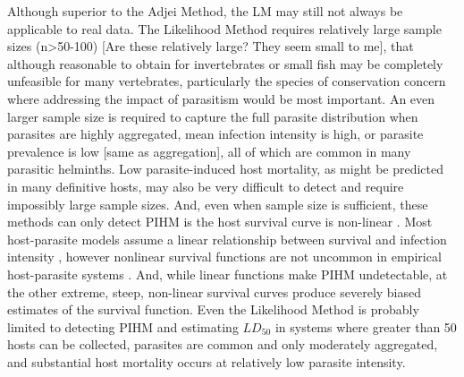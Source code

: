 \documentclass[12pt, a4paper]{article}
\begin{document}
Although superior to the Adjei Method, the LM may still not always be
applicable to real data.  The Likelihood Method requires relatively large
sample sizes (n>50-100) [Are these relatively large? They seem small to me], that although reasonable
to obtain for invertebrates or small fish may be completely unfeasible for many
vertebrates, particularly the species of conservation concern where addressing
the impact of parasitism would be most important. An even larger sample size is
required to capture the full parasite distribution when parasites are highly
aggregated, mean infection intensity is high, or parasite prevalence is low [same as aggregation],
all of which are common in many parasitic helminths.  Low parasite-induced host
mortality, as might be predicted in many definitive hosts, may also be very
difficult to detect and require impossibly large sample sizes. And, even
when sample size is sufficient, these methods can only detect PIHM is the host
survival curve is non-linear \citep{Lanciani1989}. Most host-parasite models assume a linear
relationship between survival and infection intensity \citep{AndersonandMay1978,McCallum2000a}, however
nonlinear survival functions are not uncommon in empirical host-parasite
systems \citep{Benesh2011}.  And, while linear functions make PIHM undetectable, at the other extreme, steep, non-linear survival curves produce severely biased estimates of the survival function. Even the Likelihood Method is probably limited to
detecting PIHM and estimating $LD_{50}$ in systems where greater than 50 hosts can be
collected, parasites are common and only moderately aggregated, and
substantial host mortality occurs at relatively low parasite intensity.
\end{document}
